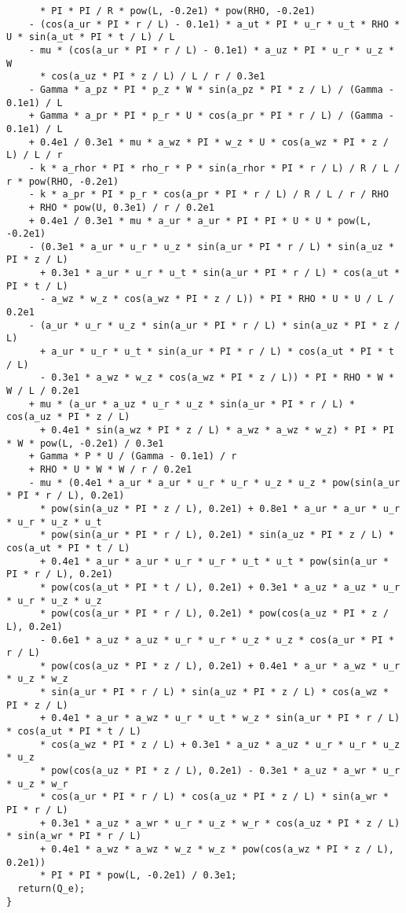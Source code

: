 \documentclass[10pt]{article}
\begin{document}
\begin{small}
\begin{verbatim}
      * PI * PI / R * pow(L, -0.2e1) * pow(RHO, -0.2e1)
    - (cos(a_ur * PI * r / L) - 0.1e1) * a_ut * PI * u_r * u_t * RHO * U * sin(a_ut * PI * t / L) / L
    - mu * (cos(a_ur * PI * r / L) - 0.1e1) * a_uz * PI * u_r * u_z * W
      * cos(a_uz * PI * z / L) / L / r / 0.3e1
    - Gamma * a_pz * PI * p_z * W * sin(a_pz * PI * z / L) / (Gamma - 0.1e1) / L
    + Gamma * a_pr * PI * p_r * U * cos(a_pr * PI * r / L) / (Gamma - 0.1e1) / L
    + 0.4e1 / 0.3e1 * mu * a_wz * PI * w_z * U * cos(a_wz * PI * z / L) / L / r
    - k * a_rhor * PI * rho_r * P * sin(a_rhor * PI * r / L) / R / L / r * pow(RHO, -0.2e1)
    - k * a_pr * PI * p_r * cos(a_pr * PI * r / L) / R / L / r / RHO
    + RHO * pow(U, 0.3e1) / r / 0.2e1
    + 0.4e1 / 0.3e1 * mu * a_ur * a_ur * PI * PI * U * U * pow(L, -0.2e1)
    - (0.3e1 * a_ur * u_r * u_z * sin(a_ur * PI * r / L) * sin(a_uz * PI * z / L)
      + 0.3e1 * a_ur * u_r * u_t * sin(a_ur * PI * r / L) * cos(a_ut * PI * t / L)
      - a_wz * w_z * cos(a_wz * PI * z / L)) * PI * RHO * U * U / L / 0.2e1
    - (a_ur * u_r * u_z * sin(a_ur * PI * r / L) * sin(a_uz * PI * z / L)
      + a_ur * u_r * u_t * sin(a_ur * PI * r / L) * cos(a_ut * PI * t / L)
      - 0.3e1 * a_wz * w_z * cos(a_wz * PI * z / L)) * PI * RHO * W * W / L / 0.2e1
    + mu * (a_ur * a_uz * u_r * u_z * sin(a_ur * PI * r / L) * cos(a_uz * PI * z / L)
      + 0.4e1 * sin(a_wz * PI * z / L) * a_wz * a_wz * w_z) * PI * PI * W * pow(L, -0.2e1) / 0.3e1
    + Gamma * P * U / (Gamma - 0.1e1) / r
    + RHO * U * W * W / r / 0.2e1
    - mu * (0.4e1 * a_ur * a_ur * u_r * u_r * u_z * u_z * pow(sin(a_ur * PI * r / L), 0.2e1)
      * pow(sin(a_uz * PI * z / L), 0.2e1) + 0.8e1 * a_ur * a_ur * u_r * u_r * u_z * u_t
      * pow(sin(a_ur * PI * r / L), 0.2e1) * sin(a_uz * PI * z / L) * cos(a_ut * PI * t / L)
      + 0.4e1 * a_ur * a_ur * u_r * u_r * u_t * u_t * pow(sin(a_ur * PI * r / L), 0.2e1)
      * pow(cos(a_ut * PI * t / L), 0.2e1) + 0.3e1 * a_uz * a_uz * u_r * u_r * u_z * u_z
      * pow(cos(a_ur * PI * r / L), 0.2e1) * pow(cos(a_uz * PI * z / L), 0.2e1)
      - 0.6e1 * a_uz * a_uz * u_r * u_r * u_z * u_z * cos(a_ur * PI * r / L)
      * pow(cos(a_uz * PI * z / L), 0.2e1) + 0.4e1 * a_ur * a_wz * u_r * u_z * w_z
      * sin(a_ur * PI * r / L) * sin(a_uz * PI * z / L) * cos(a_wz * PI * z / L)
      + 0.4e1 * a_ur * a_wz * u_r * u_t * w_z * sin(a_ur * PI * r / L) * cos(a_ut * PI * t / L)
      * cos(a_wz * PI * z / L) + 0.3e1 * a_uz * a_uz * u_r * u_r * u_z * u_z
      * pow(cos(a_uz * PI * z / L), 0.2e1) - 0.3e1 * a_uz * a_wr * u_r * u_z * w_r
      * cos(a_ur * PI * r / L) * cos(a_uz * PI * z / L) * sin(a_wr * PI * r / L)
      + 0.3e1 * a_uz * a_wr * u_r * u_z * w_r * cos(a_uz * PI * z / L) * sin(a_wr * PI * r / L)
      + 0.4e1 * a_wz * a_wz * w_z * w_z * pow(cos(a_wz * PI * z / L), 0.2e1))
      * PI * PI * pow(L, -0.2e1) / 0.3e1;
  return(Q_e);
}
\end{verbatim}
\end{small}





\end{document}
